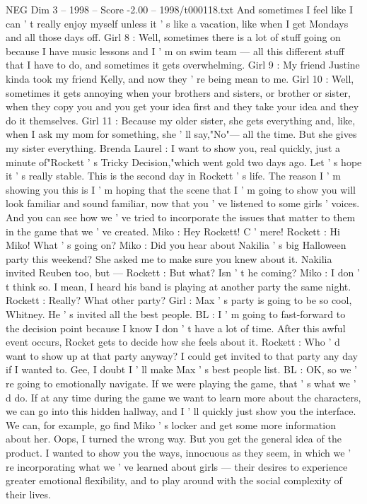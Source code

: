 \begin{textsample}{NEG Dim 3 – 1998 – Score -2.00 – 1998/t000118.txt}
And sometimes I feel like I can ' t really enjoy myself unless it ' s like a vacation, like when I get Mondays and all those days off.
Girl 8 : Well, sometimes there is a lot of stuff going on because I have music lessons and I ' m on swim team — all this different stuff that I have to do, and sometimes it gets overwhelming.
Girl 9 : My friend Justine kinda took my friend Kelly, and now they ' re being mean to me.
Girl 10 : Well, sometimes it gets annoying when your brothers and sisters, or brother or sister, when they copy you and you get your idea first and they take your idea and they do it themselves.
Girl 11 : Because my older sister, she gets everything and, like, when I ask my mom for something, she ' ll say,"No"— all the time.
But she gives my sister everything.
Brenda Laurel : I want to show you, real quickly, just a minute of"Rockett ' s Tricky Decision,"which went gold two days ago.
Let ' s hope it ' s really stable.
This is the second day in Rockett ' s life.
The reason I ' m showing you this is I ' m hoping that the scene that I ' m going to show you will look familiar and sound familiar, now that you ' ve listened to some girls ' voices.
And you can see how we ' ve tried to incorporate the issues that matter to them in the game that we ' ve created.
Miko : Hey Rockett!
C ' mere!
Rockett : Hi Miko!
What ' s going on?
Miko : Did you hear about Nakilia ' s big Halloween party this weekend?
She asked me to make sure you knew about it.
Nakilia invited Reuben too, but — Rockett : But what?
Isn ' t he coming?
Miko : I don ' t think so.
I mean, I heard his band is playing at another party the same night.
Rockett : Really?
What other party?
Girl : Max ' s party is going to be so cool, Whitney.
He ' s invited all the best people.
BL : I ' m going to fast-forward to the decision point because I know I don ' t have a lot of time.
After this awful event occurs, Rocket gets to decide how she feels about it.
Rockett : Who ' d want to show up at that party anyway?
I could get invited to that party any day if I wanted to.
Gee, I doubt I ' ll make Max ' s best people list.
BL : OK, so we ' re going to emotionally navigate.
If we were playing the game, that ' s what we ' d do.
If at any time during the game we want to learn more about the characters, we can go into this hidden hallway, and I ' ll quickly just show you the interface.
We can, for example, go find Miko ' s locker and get some more information about her.
Oops, I turned the wrong way.
But you get the general idea of the product.
I wanted to show you the ways, innocuous as they seem, in which we ' re incorporating what we ' ve learned about girls — their desires to experience greater emotional flexibility, and to play around with the social complexity of their lives.

\end{textsample}
